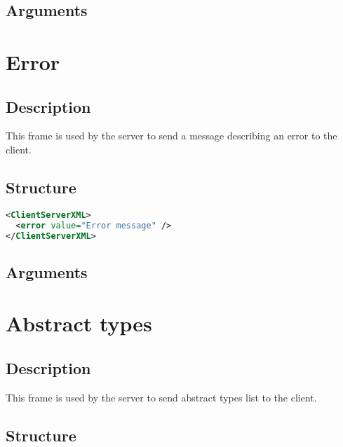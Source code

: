 \subsection{Arguments}


\section{Error}
\label{error}

\subsection{Description}

This frame is used by the server to send a message describing an error to
the client.

\subsection{Structure}

\begin{lstlisting}[language=XML]
<ClientServerXML>
  <error value="Error message" />
</ClientServerXML>
\end{lstlisting}

\subsection{Arguments}


\section{Abstract types}
\label{abstractTypes}

\subsection{Description}

This frame is used by the server to send abstract types list to the client. 

\subsection{Structure}

